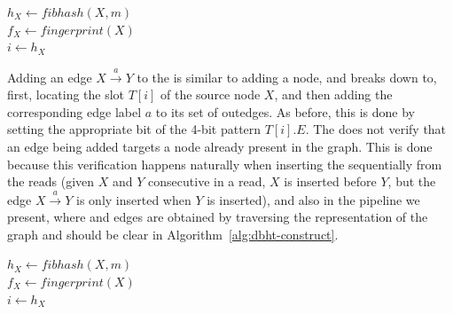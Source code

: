 \begin{algorithm}
	\caption{$T.\mathit{query}(X)$}\label{alg:ht-query}
	$h_X \gets \mathit{fibhash}(X, m)$\\
  $f_X \gets \mathit{fingerprint}(X)$\\
	$i \gets h_X$\\
  \Return{$\varnothing$}
\end{algorithm}


Adding an edge $X\stackrel{a}{\longrightarrow}Y$ to the \dBHT is similar to adding a \kmer node, and breaks down to, first, locating the slot $T[i]$ of the source node $X$, and then adding the corresponding edge label $a$ to its set of outedges. As before, this is done by setting the appropriate bit of the  4-bit pattern $T[i].E$. The \dBHT does not verify that an edge being added targets a node already present in the graph. This is done because this verification happens naturally when inserting the  sequentially from the reads (given  $X$ and $Y$ consecutive in a read, $X$ is inserted before $Y$, but the edge $X\stackrel{a}{\longrightarrow}Y$ is only inserted when $Y$ is inserted), and also in the pipeline we present, where  and edges are obtained by traversing the \dBCM representation of the graph and should be clear in Algorithm~\ref{alg:dbht-construct}. 


\begin{algorithm}
  \caption{$T.\mathit{add\_outedge}(X, a)$}\label{alg:ht-addedge}
  $h_X \gets \mathit{fibhash}(X, m)$\\
  $f_X \gets \mathit{fingerprint}(X)$\\
  $i \gets h_X$\\
  \Return{$\varnothing$}
\end{algorithm}


